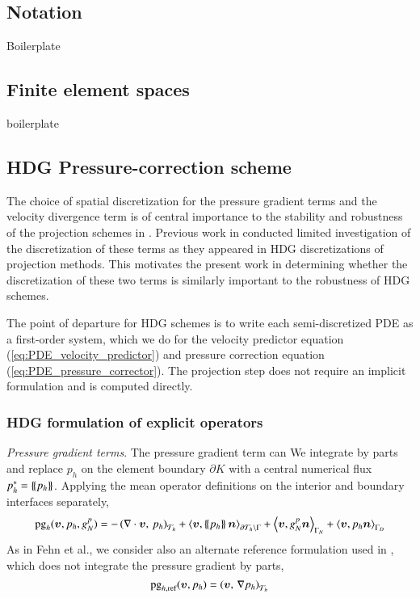 \subsection{Notation}
Boilerplate

\subsection{Finite element spaces}
boilerplate

\subsection{HDG Pressure-correction scheme}

The choice of spatial discretization for the pressure gradient terms and the velocity divergence term is of central importance to the stability and robustness of the projection schemes in \cite{fehn_robust_2018}. Previous work in \cite{ueckermann_lermusiaux_JCP2016} conducted limited investigation of the discretization of these terms as they appeared in HDG discretizations of projection methods. This motivates the present work in determining whether the discretization of these two terms is similarly important to the robustness of HDG schemes. 

The point of departure for HDG schemes is to write each semi-discretized PDE as a first-order system, which we do for the velocity predictor equation (\ref{eq:PDE_velocity_predictor})  and pressure correction equation (\ref{eq:PDE_pressure_corrector}). The projection step does not require an implicit formulation and is computed directly.

\subsubsection{HDG formulation of explicit operators}

\textit{Pressure gradient terms}. The pressure gradient term can 
We integrate by parts and replace $p_h$ on the element boundary $\partial K$ with a central numerical flux $p^*_h = \left\{\!\left\{p_h\right\}\!\right\} $. Applying the mean operator definitions on the interior and boundary interfaces separately,
\begin{equation}
  \text{pg}_h(\bm{v}, p_h, g_N^p) = -\left(\nabla \cdot \bm{v},\, p_h \right)_{\mathcal{T}_h} 
  + \left\langle \bm{v},\left\{\!\left\{p_h\right\}\!\right\}\bm{n}\right\rangle_{\partial\mathcal{T}_h \setminus \Gamma}
  + \left\langle \bm{v}, g_N^p\bm{n}\right\rangle_{\Gamma_N}
  + \left\langle \bm{v}, p_h\bm{n}\right\rangle_{\Gamma_D}
\end{equation}%
As in Fehn et al., we consider also an alternate reference formulation used in \cite{hesthaven_nodal_2008,ueckermann_lermusiaux_JCP2016}, which does not integrate the pressure gradient by parts,
\begin{equation}
  \text{pg}_{h,\text{ref}}(\bm{v}, p_h) = \left(\bm{v},\, \nabla p_h \right)_{\mathcal{T}_h} 
\end{equation}

